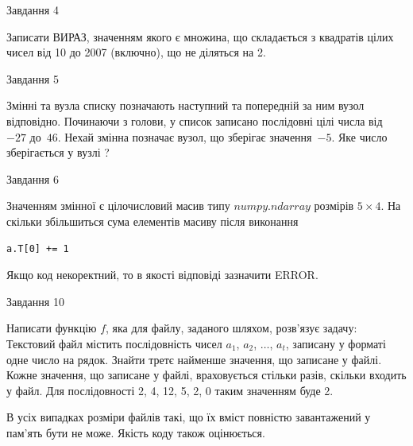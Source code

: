 \documentclass[12pt, ukrainian]{article}
\begin{document}
{               
{\begin{center}Завдання {4}\end{center}}
\vspace{-6mm}
Записати ВИРАЗ, значенням якого є множина, що складається з квадратів цілих чисел від 10 до 2007 (включно), що не діляться на 2.\par

\vspace{10mm}
               
{\begin{center}Завдання {5}\end{center}}
\vspace{-6mm}
Змінні  та  вузла списку позначають наступний та попередній за ним вузол відповідно. Починаючи з голови, у список записано послідовні цілі числа від~$-27$ до~$46$. Нехай змінна  позначає вузол, що зберігає значення~$-5$.
Яке число зберігається у вузлі  ?\par

               
{\begin{center}Завдання {6}\end{center}}
\vspace{-6mm}
Значенням змінної  є цілочисловий масив типу $numpy.ndarray$ розмірів $5{\times}4$. На скільки збільшиться сума елементів масиву  після виконання
\begin{verbatim}
a.T[0] += 1
\end{verbatim}


Якщо код некоректний, то в якості відповіді зазначити ERROR.\par

               
{\begin{center}Завдання {10}\end{center}}
\vspace{-6mm}

Написати функцію $f$, яка для файлу, заданого шляхом, розв’язує задачу:\\ Текстовий файл містить послідовність чисел $a_1$, $a_2$, $\ldots$, $a_t$, записану у форматі одне число на рядок. Знайти третє найменше значення, що записане у файлі. Кожне значення, що записане у файлі, враховується стільки разів, скільки входить у файл. Для послідовності 2, 4, 12, 5, 2, 0 таким значенням буде 2.

В усіх випадках розміри файлів такі, що їх вміст повністю завантажений у пам'ять бути не може. Якість коду також оцінюється.



}
\end{document}
